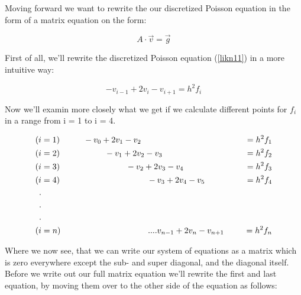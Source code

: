 \documentclass{article}
\begin{document}
Moving forward we want to rewrite the our discretized Poisson equation in the form of a matrix equation on the form:

\begin{equation}\label{likn12}
    A \cdot \Vec{v} = \Vec{g}  
\end{equation}

First of all, we'll rewrite the discretized Poisson equation (\ref{likn11}) in a more intuitive way:

\begin{equation}\label{likn13}
    -v_{i-1} + 2v_i - v_{i+1} = h^2f_i 
\end{equation}

Now we'll examin more closely what we get if we calculate different points for $f_i$ in a range from i = 1 to i = 4.

\begin{center}
    \begin{align*}
    (i &= 1)\hspace{1cm}  -v_0 + 2v_1 - v_2 \qquad \qquad &= h^2f_1 \\
    (i &= 2)\hspace{1.9cm}  -v_1 + 2v_2 - v_3 \qquad \qquad &= h^2f_2 \\
    (i &= 3)\hspace{2.8cm}  -v_2 + 2v_3 - v_4 \qquad \qquad &= h^2f_3 \\
    (i &= 4)\hspace{3.7cm}  -v_3 + 2v_4 - v_5 \qquad \qquad &= h^2f_4 \\
    . \\
    . \\
    . \\
    (i &= n) \hspace{3.7 cm} .... v_{n-1} + 2v_n - v_{n+1} &= h^2f_n 
\end{align*}
\end{center}

Where we now see, that we can write our system of equations as a matrix which is zero everywhere except the sub- and super diagonal, and the diagonal itself. Before we write out our full matrix equation we'll rewrite the first and last equation, by moving them over to the other side of the equation as follows:
\end{document}
